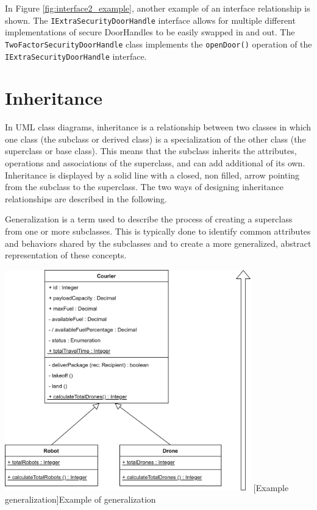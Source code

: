 \documentclass[
	12pt,
    a4paper,
    egregdoesnotlikesansseriftitles, %
    toc=chapterentrywithdots,
    oneside, openany,
    titlepage,
    parskip=half,
    headings=normal,  %
    listof=totoc,
    bibliography=totocnumbered,
    index=totoc,
    captions=tableheading,  %
    listof=flat,
    numbers=noenddot, %
    final]
    {scrbook}
\begin{document}
In Figure \ref{fig:interface2_example}, another example of an interface relationship is shown. 
The \texttt{IExtraSecurityDoorHandle} interface allows for multiple different implementations of secure DoorHandles to be easily swapped in and out. The \texttt{TwoFactorSecurityDoorHandle} class implements the \texttt{openDoor()} operation of the \texttt{IExtraSecurityDoorHandle} interface.


\chapter{Inheritance}
In UML class diagrams, inheritance is a relationship between two classes in which one class (the subclass or derived class) is a specialization of the other class (the superclass or base class). 
This means that the subclass inherits the attributes, operations and associations of the superclass, and can add additional of its own.
Inheritance is displayed by a solid line with a closed, non filled, arrow pointing from the subclass to the superclass.
The two ways of designing inheritance relationships are described in the following.

Generalization is a term used to describe the process of creating a superclass from one or more subclasses. 
This is typically done to identify common attributes and behaviors shared by the subclasses and to create a more generalized, abstract representation of these concepts. \cite[p. 69-70] {seidl2015uml} \cite{ibm_generalization}


\vspace{1em}
\begin{minipage}{\linewidth}
	\centering
	\includegraphics[width=0.8\textwidth]{figures/inheritance/generalization.jpg}
	[Example generalization]{Example of generalization}
	\label{fig:generalization}
\end{minipage}
\vspace{1em}
\end{document}
